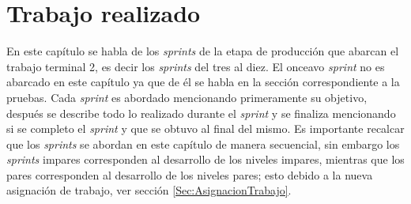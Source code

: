 \chapter{Trabajo realizado} \label{TrabajoTT2}
En este capítulo se habla de los \textit{sprints} de la etapa de producción que
abarcan el trabajo terminal 2, es decir los \textit{sprints} del tres al diez. El
onceavo \textit{sprint} no es abarcado en este capítulo ya que de él se habla en la
sección correspondiente a la pruebas. Cada \textit{sprint} es abordado mencionando
primeramente su objetivo, después se describe todo lo realizado durante el
\textit{sprint} y se finaliza mencionando si se completo el \textit{sprint} y que
se obtuvo al final del mismo. Es importante recalcar que los \textit{sprints} se
abordan en este capítulo de manera secuencial, sin embargo los \textit{sprints}
impares corresponden al desarrollo de los niveles impares, mientras que los pares
corresponden al desarrollo de los niveles pares; esto debido a la nueva asignación
de trabajo, ver sección \ref{Sec:AsignacionTrabajo}.

%

%

%

%

%



